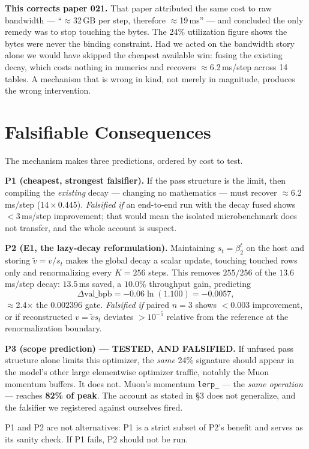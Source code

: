 \documentclass{article}
\newcommand{\vb}{\mathrm{val\_bpb}}
\begin{document}
\textbf{This corrects paper 021.} That paper attributed the same cost to raw bandwidth --- ``$\approx$32\,GB per step, therefore $\approx$19\,ms'' --- and concluded the only remedy was to stop touching the bytes. The 24\% utilization figure shows the bytes were never the binding constraint. Had we acted on the bandwidth story alone we would have skipped the cheapest available win: fusing the existing decay, which costs nothing in numerics and recovers $\approx$6.2\,ms/step across 14 tables. A mechanism that is wrong in kind, not merely in magnitude, produces the wrong intervention.

\section{Falsifiable Consequences}
The mechanism makes three predictions, ordered by cost to test.

\textbf{P1 (cheapest, strongest falsifier).} If the pass structure is the limit, then compiling the \emph{existing} decay --- changing no mathematics --- must recover $\approx$6.2\,ms/step ($14\times0.445$). \emph{Falsified if} an end-to-end run with the decay fused shows $<$3\,ms/step improvement; that would mean the isolated microbenchmark does not transfer, and the whole account is suspect.

\textbf{P2 (E1, the lazy-decay reformulation).} Maintaining $s_t=\beta_2^t$ on the host and storing $\tilde v = v/s_t$ makes the global decay a scalar update, touching touched rows only and renormalizing every $K{=}256$ steps. This removes $255/256$ of the $13.6$\,ms/step decay: $13.5$\,ms saved, a $10.0\%$ throughput gain, predicting
\[
\Delta\vb = -0.06\ln(1.100) = \mathbf{-0.0057},
\]
$\approx$2.4$\times$ the $0.002396$ gate. \emph{Falsified if} paired $n{=}3$ shows $<0.003$ improvement, or if reconstructed $v = \tilde v s_t$ deviates $>10^{-5}$ relative from the reference at the renormalization boundary.

\textbf{P3 (scope prediction) --- TESTED, AND FALSIFIED.} If unfused pass structure alone limits this optimizer, the \emph{same} 24\% signature should appear in the model's other large elementwise optimizer traffic, notably the Muon momentum buffers. It does not. Muon's momentum \texttt{lerp\_} --- the \emph{same operation} --- reaches \textbf{82\% of peak}. The account as stated in \S3 does not generalize, and the falsifier we registered against ourselves fired.

P1 and P2 are not alternatives: P1 is a strict subset of P2's benefit and serves as its sanity check. If P1 fails, P2 should not be run.
\end{document}
